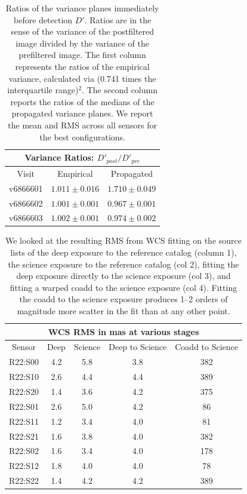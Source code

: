 \documentclass[prd, nofootinbib, floatfix, 11pt,tightenlines,times]{article}
\begin{document}
{\begin{table}
\centering
\begin{tabular}{ccc}
\hline
\multicolumn{3}{|c|}{Variance Ratios: $D'_{post} / D'_{pre}$} \\
\hline
Visit    & Empirical & Propagated \\
\hline
v6866601 & $1.011 \pm 0.016$    & $1.710 \pm 0.049$    \\
v6866602 & $1.001 \pm 0.001$    & $0.967 \pm 0.001$    \\
v6866603 & $1.002 \pm 0.001$    & $0.974 \pm 0.002$    \\
\end{tabular}
\caption{Ratios of the variance planes immediately before detection
  $D'$.  Ratios are in the sense of the variance of the postfiltered
  image divided by the variance of the prefiltered image.  The first
  column represents the ratios of the empirical variance, calculated
  via (0.741 times the interquartile range)$^2$.  The second column
  reports the ratios of the medians of the propagated variance planes.
  We report the mean and RMS across all sensors for the best
  configurations.}
\label{tab-variance2}
\end{table}


\clearpage
\begin{table}
\centering
\begin{tabular}{|c|c|c|c|c|}
\hline
\multicolumn{5}{|c|}{WCS RMS in mas at various stages} \\
\hline
Sensor    & Deep & Science &  Deep to Science & Coadd to Science \\
\hline
R22:S00&4.2&5.8&3.8&382\\ 
R22:S10&2.6&4.4&4.4&389\\
R22:S20&1.4&3.6&4.2&375\\
R22:S01&2.6&5.0&4.2&86\\
R22:S11&1.2&3.4&4.0&81\\
R22:S21&1.6&3.8&4.0&382\\
R22:S02&1.6&3.4&4.0&178\\
R22:S12&1.8&4.0&4.0&78\\
R22:S22&1.4&4.2&4.2&389\\
\hline
\end{tabular}
\caption{We looked at the resulting RMS from WCS fitting on the source lists of the deep exposure to the 
reference catalog (column 1), the science exposure to the reference catalog (col 2),
fitting the deep exposure directly to the science exposure (col 3), and fitting a warped coadd to the science exposure (col 4).  
Fitting the coadd to the science exposure produces 1--2 orders of magnitude more scatter in the fit than at any other 
point. \label{tab-wcsrms}}
\end{table}
\clearpage


}
\end{document}
